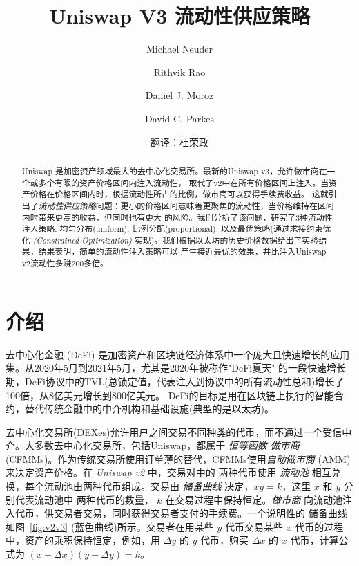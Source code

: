 \documentclass[sigconf, dvipsnames]{acmart}
\begin{document}
\title{Uniswap V3 流动性供应策略}

\author{Michael Neuder}

\author{Rithvik Rao}

\author{Daniel J. Moroz}

\author{David C. Parkes}

\author{翻译：杜荣政}

\begin{abstract}
    \quad Uniswap 是加密资产领域最大的去中心化交易所。最新的Uniswap v3，允许做市商在一个或多个有限的资产价格区间内注入流动性，
    取代了v2中在所有价格区间上注入。当资产价格在价格区间内时，根据流动性所占的比例，做市商可以获得手续费收益。
    这就引出了{\em 流动性供应策略}问题：更小的价格区间意味着更聚焦的流动性，当价格维持在区间内时带来更高的收益，但同时也有更大
    的风险。我们分析了该问题，研究了3种流动性注入策略: 均匀分布(uniform), 比例分配(proportional), 以及最优策略(通过求接约束优
    化 {\em (Constrained Optimization)} 实现)。我们根据以太坊的历史价格数据给出了实验结果，结果表明，简单的流动性注入策略可以
    产生接近最优的效果，并比注入Uniswap v2流动性多赚200多倍。
\end{abstract}


\maketitle

\section{介绍}\label{sec:intro}
\quad 去中心化金融 (DeFi) 是加密资产和区块链经济体系中一个庞大且快速增长的应用集。从2020年5月到2021年5月，尤其是2020年被称作"DeFi夏天"
的一段快速增长期，DeFi协议中的TVL(总锁定值，代表注入到协议中的所有流动性总和)增长了100倍，从8亿美元增长到800亿美元\cite{defipulse}。
DeFi的目标是用在区块链上执行的智能合约，替代传统金融中的中介机构和基础设施(典型的是以太坊)。

去中心化交易所(DEXes)允许用户之间交易不同种类的代币，而不通过一个受信中介。大多数去中心化交易所，包括Uniswap，都属于 {\em 恒等函数
做市商} (CFMMs)。作为传统交易所使用订单薄的替代，CFMMs使用{\em 自动做市商} (AMM)来决定资产价格。在 {\em Uniswap v2} 中，交易对中的
两种代币使用 {\em 流动池} 相互兑换，每个流动池由两种代币组成。交易由 {\em 储备曲线} 决定，$x y= k$，这里 $x$ 和 $y$ 分别代表流动池中
两种代币的数量， $k$ 在交易过程中保持恒定。{\em 做市商} 向流动池注入代币，供交易者交易，同时获得交易者支付的手续费。一个说明性的
储备曲线如图~\ref{fig:v2v3} (蓝色曲线)所示。交易者在用某些 $y$ 代币交易某些 $x$ 代币的过程中，资产的乘积保持恒定，例如，用 $\Delta y$ 的 $y$ 
代币，购买 $\Delta x$ 的 $x$ 代币，计算公式为 $(x-\Delta x) (y + \Delta y) = k$。
\end{document}
